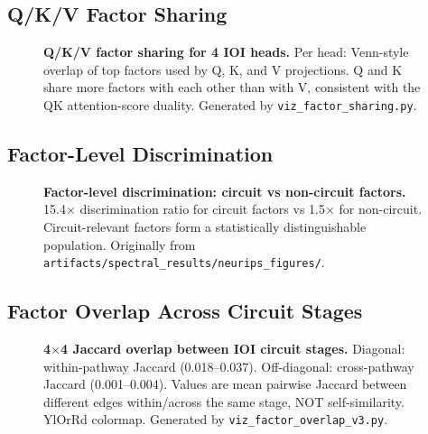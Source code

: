 \documentclass[11pt]{article}
\begin{document}

\subsection{Q/K/V Factor Sharing}
\label{fig:qkv_sharing}

\begin{figure}[h!]
\centering
\caption{\textbf{Q/K/V factor sharing for 4 IOI heads.}
Per head: Venn-style overlap of top factors used by Q, K, and V
projections. Q and K share more factors with each other than with V,
consistent with the QK attention-score duality. Generated by
\texttt{viz\_factor\_sharing.py}.}
\end{figure}


\subsection{Factor-Level Discrimination}
\label{fig:discrimination}

\begin{figure}[h!]
\centering
\caption{\textbf{Factor-level discrimination: circuit vs non-circuit
factors.} 15.4$\times$ discrimination ratio for circuit factors vs
1.5$\times$ for non-circuit. Circuit-relevant factors form a
statistically distinguishable population. Originally from
\texttt{artifacts/spectral\_results/neurips\_figures/}.}
\end{figure}


\subsection{Factor Overlap Across Circuit Stages}
\label{fig:factor_overlap}

\begin{figure}[h!]
\centering
\caption{\textbf{4$\times$4 Jaccard overlap between IOI circuit stages.}
Diagonal: within-pathway Jaccard (0.018--0.037). Off-diagonal:
cross-pathway Jaccard (0.001--0.004). Values are mean pairwise
Jaccard between different edges within/across the same stage, NOT
self-similarity. YlOrRd colormap. Generated by
\texttt{viz\_factor\_overlap\_v3.py}.}
\end{figure}
\end{document}
